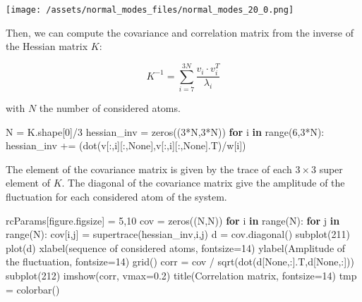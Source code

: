 \documentclass[
]{article}
\newenvironment{Shaded}{}{}
\newcommand{\BuiltInTok}[1]{\textcolor[rgb]{0.00,0.50,0.00}{#1}}
\newcommand{\ControlFlowTok}[1]{\textcolor[rgb]{0.00,0.44,0.13}{\textbf{#1}}}
\newcommand{\DecValTok}[1]{\textcolor[rgb]{0.25,0.63,0.44}{#1}}
\newcommand{\FloatTok}[1]{\textcolor[rgb]{0.25,0.63,0.44}{#1}}
\newcommand{\KeywordTok}[1]{\textcolor[rgb]{0.00,0.44,0.13}{\textbf{#1}}}
\newcommand{\NormalTok}[1]{#1}
\newcommand{\OperatorTok}[1]{\textcolor[rgb]{0.40,0.40,0.40}{#1}}
\newcommand{\StringTok}[1]{\textcolor[rgb]{0.25,0.44,0.63}{#1}}
\newcommand{\VariableTok}[1]{\textcolor[rgb]{0.10,0.09,0.49}{#1}}
\begin{document}
\texttt{[image: /assets/normal\_modes\_files/normal\_modes\_20\_0.png]}

Then, we can compute the covariance and correlation matrix from the
inverse of the Hessian matrix \(K\):

\[K^{-1} = \sum_{i=7}^{3N} \frac{v_{i} \cdot v_{i}^{T}}{\lambda_{i}}\]

with \(N\) the number of considered atoms.

\begin{Shaded}
\begin{Highlighting}[]
\NormalTok{N }\OperatorTok{=}\NormalTok{ K.shape[}\DecValTok{0}\NormalTok{]}\OperatorTok{/}\DecValTok{3}
\NormalTok{hessian\_inv }\OperatorTok{=}\NormalTok{ zeros((}\DecValTok{3}\OperatorTok{*}\NormalTok{N,}\DecValTok{3}\OperatorTok{*}\NormalTok{N))}
\ControlFlowTok{for}\NormalTok{ i }\KeywordTok{in} \BuiltInTok{range}\NormalTok{(}\DecValTok{6}\NormalTok{,}\DecValTok{3}\OperatorTok{*}\NormalTok{N):}
\NormalTok{    hessian\_inv }\OperatorTok{+=}\NormalTok{ (dot(v[:,i][:,}\VariableTok{None}\NormalTok{],v[:,i][:,}\VariableTok{None}\NormalTok{].T)}\OperatorTok{/}\NormalTok{w[i])}
\end{Highlighting}
\end{Shaded}

The element of the covariance matrix is given by the trace of each
\(3 \times 3\) super element of \(K\). The diagonal of the covariance
matrix give the amplitude of the fluctuation for each considered atom of
the system.

\begin{Shaded}
\begin{Highlighting}[]
\NormalTok{rcParams[}\StringTok{\textquotesingle{}figure.figsize\textquotesingle{}}\NormalTok{] }\OperatorTok{=} \DecValTok{5}\NormalTok{,}\DecValTok{10}
\NormalTok{cov }\OperatorTok{=}\NormalTok{ zeros((N,N))}
\ControlFlowTok{for}\NormalTok{ i }\KeywordTok{in} \BuiltInTok{range}\NormalTok{(N):}
    \ControlFlowTok{for}\NormalTok{ j }\KeywordTok{in} \BuiltInTok{range}\NormalTok{(N):}
\NormalTok{        cov[i,j] }\OperatorTok{=}\NormalTok{ supertrace(hessian\_inv,i,j)}
\NormalTok{d }\OperatorTok{=}\NormalTok{ cov.diagonal()}
\NormalTok{subplot(}\DecValTok{211}\NormalTok{)}
\NormalTok{plot(d)}
\NormalTok{xlabel(}\StringTok{\textquotesingle{}sequence of considered atoms\textquotesingle{}}\NormalTok{, fontsize}\OperatorTok{=}\DecValTok{14}\NormalTok{)}
\NormalTok{ylabel(}\StringTok{\textquotesingle{}Amplitude of the fluctuation\textquotesingle{}}\NormalTok{, fontsize}\OperatorTok{=}\DecValTok{14}\NormalTok{)}
\NormalTok{grid()}
\NormalTok{corr }\OperatorTok{=}\NormalTok{ cov }\OperatorTok{/}\NormalTok{ sqrt(dot(d[}\VariableTok{None}\NormalTok{,:].T,d[}\VariableTok{None}\NormalTok{,:]))}
\NormalTok{subplot(}\DecValTok{212}\NormalTok{)}
\NormalTok{imshow(corr, vmax}\OperatorTok{=}\FloatTok{0.2}\NormalTok{)}
\NormalTok{title(}\StringTok{\textquotesingle{}Correlation matrix\textquotesingle{}}\NormalTok{, fontsize}\OperatorTok{=}\DecValTok{14}\NormalTok{)}
\NormalTok{tmp }\OperatorTok{=}\NormalTok{ colorbar()}
\end{Highlighting}
\end{Shaded}
\end{document}
